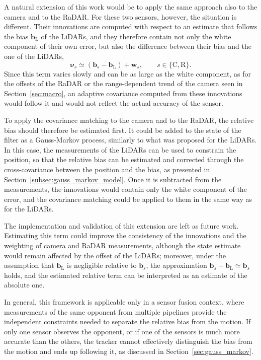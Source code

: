 A natural extension of this work would be to apply the same approach also to the camera and
to the RaDAR. For these two sensors, however, the situation is different. Their innovations
are computed with respect to an estimate that follows the bias $\mathbf{b}_{\mathrm{L}}$ of
the LiDARs, and they therefore contain not only the white component of their own error, but
also the difference between their bias and the one of the LiDARs,
\begin{equation}
    \boldsymbol{\nu}_s \simeq \left(\mathbf{b}_s - \mathbf{b}_{\mathrm{L}}\right) + \mathbf{w}_s,
    \qquad s \in \{\mathrm{C}, \mathrm{R}\}.
    \label{eq:fw_innov}
\end{equation}
Since this term varies slowly and can be as large as the white component, as for the
offsets of the RaDAR or the range-dependent trend of the camera seen in
Section~\ref{sec:macro}, an adaptive covariance computed from these innovations would follow
it and would not reflect the actual accuracy of the sensor.

To apply the covariance matching to the camera and to the RaDAR, the relative bias should
therefore be estimated first. It could be added to the state of the filter as a Gauss-Markov
process, similarly to what was proposed for the LiDARs. In this case, the measurements of
the LiDARs can be used to constrain the position, so that the relative bias can be
estimated and corrected through the cross-covariance between the position and the bias, as
presented in Section~\ref{subsec:gauss_markov_model}. Once it is subtracted from the measurements, the
innovations would contain only the white component of the error, and the covariance matching
could be applied to them in the same way as for the LiDARs.

The implementation and validation of this extension are left as future work. Estimating this
term could improve the consistency of the innovations and the weighting of camera and RaDAR
measurements, although the state estimate would remain affected by the offset of the LiDARs;
moreover, under the assumption that $\mathbf{b}_{\mathrm{L}}$ is negligible relative to
$\mathbf{b}_s$, the approximation $\mathbf{b}_s - \mathbf{b}_{\mathrm{L}} \simeq \mathbf{b}_s$
holds, and the estimated relative term can be interpreted as an estimate of the absolute one.

In general, this framework is applicable only in a sensor fusion context, where measurements
of the same opponent from multiple pipelines provide the independent constraints needed to
separate the relative bias from the motion. If only one sensor observes the opponent, or if
one of the sensors is much more accurate than the others, the tracker cannot effectively distinguish the bias from the motion and ends
up following it, as discussed in Section~\ref{sec:gauss_markov}.

